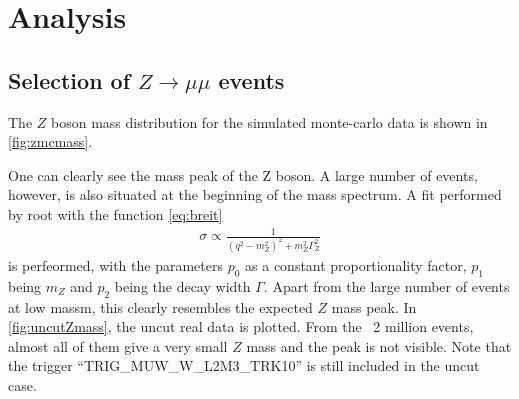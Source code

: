\documentclass[twoside,        %
               BCOR12mm,       %
               ngerman,english, %
               fleqn,headsepline=false,footsepline=false
              ]{Vorlage/MFPREPORT}
\begin{document}
\section{Analysis}
\label{sec:analysis}
\subsection{Selection of $Z \rightarrow \mu\mu$ events}
The $Z$ boson mass distribution for the simulated monte-carlo data is shown in
\cref{fig:zmcmass}.
\begin{figure}
\end{figure}
One can clearly see the mass peak of the Z boson. A large number of events,
however, is also situated at the beginning of the mass spectrum. A fit
performed by root with the function \ref{eq:breit}
\begin{align}
    \sigma\propto\frac{1}{(q^2-m_Z^2)^2+m_Z^2\Gamma_Z^2}
    \label{eq:breit}
\end{align}
is perfeormed, with the parameters $p_0$ as a constant proportionality factor,
$p_1$ being $m_Z$ and $p_2$ being the decay width $\Gamma$.
Apart from the large number of events at low massm, this clearly resembles the
expected $Z$ mass peak. In \cref{fig:uncutZmass}, the uncut real data is
plotted. From the ~2 million events, almost all of them give a very small $Z$
mass and the peak is not visible. Note that the trigger
``TRIG\_MUW\_W\_L2M3\_TRK10'' \cite{fprakt} is still included in the uncut case.
\end{document}
